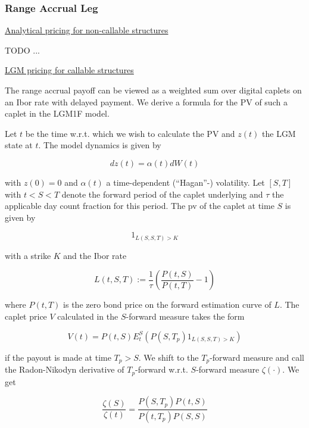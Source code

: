 \subsubsection{Range Accrual Leg}
\label{pricing:ir_rangeaccrualleg}

\underline{Analytical pricing for non-callable structures}

TODO ...

\underline{LGM pricing for callable structures}

The range accrual payoff can be viewed as a weighted sum over digital caplets on an Ibor rate with delayed
payment. We derive a formula for the PV of such a caplet in the LGM1F model.

Let $t$ be the time w.r.t. which we wish to calculate the PV and $z(t)$ the LGM state at $t$. The model dynamics is given by

\begin{equation}
dz(t) = \alpha(t) dW(t)
\end{equation}

with $z(0) = 0$ and $\alpha(t)$ a time-dependent (``Hagan''-) volatility. Let $[S,T]$ with $t<S<T$ denote the forward
period of the caplet underlying and $\tau$ the applicable day count fraction for this period. The pv of the caplet at
time $S$ is given by

\begin{equation}\label{pricing:ir_rangeaccrualleg_payout}
1_{L(S,S,T) > K}
\end{equation}

with a strike $K$ and the Ibor rate

\begin{equation}
L(t,S,T) := \frac{1}{\tau} \left( \frac{P(t,S)}{P(t,T)} - 1 \right)
\end{equation}

where $P(t,T)$ is the zero bond price on the forward estimation curve of $L$. The caplet price $V$ calculated in the
$S$-forward measure takes the form

\begin{equation}
V(t) = P(t,S) E^{S}_t( P(S,T_p) 1_{L(S,S,T) > K} )
\end{equation}

if the payout is made at time $T_p > S$. We shift to the $T_p$-forward measure and call the Radon-Nikodyn derivative of
$T_p$-forward w.r.t. $S$-forward measure $\zeta(\cdot)$. We get

\begin{equation}
\frac{\zeta(S)}{\zeta(t)} = \frac{P(S,T_p)P(t,S)}{P(t,T_p)P(S,S)}
\end{equation}


